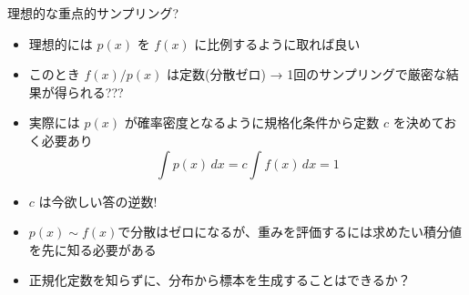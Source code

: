 \begin{frame}[t,fragile]{理想的な重点的サンプリング?}
  \begin{itemize}
  \item 理想的には $p(x)$ を $f(x)$ に比例するように取れば良い
  \item このとき $f(x) / p(x)$ は定数(分散ゼロ) → 1回のサンプリングで厳密な結果が得られる???
  \item 実際には $p(x)$ が確率密度となるように規格化条件から定数 $c$ を決めておく必要あり
    \[
    \int p(x) \, dx = c \int f(x) \, dx = 1
    \]
  \item $c$ は今欲しい答の逆数! \\[2em]
  \item $p(x) \sim f(x)$で分散はゼロになるが、重みを評価するには求めたい積分値を先に知る必要がある
  \item 正規化定数を知らずに、分布から標本を生成することはできるか？
  \end{itemize}
\end{frame}
